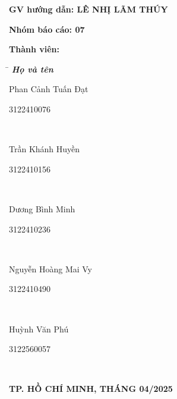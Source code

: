 \documentclass[a4paper,12pt]{report}
\begin{document}
\begin{titlepage}
    \vspace{15pt}
    \textbf{GV hướng dẫn: LÊ NHỊ LÃM THÚY}

    \vspace{10pt}
    \textbf{Nhóm báo cáo: 07}

    \vspace{10pt}
    \textbf{Thành viên:}
    \begin{center}
        
        \begin{tabbing}
            \hspace{8cm}\=\hspace{3cm} \kill
            {\it \textbf{Họ và tên}}\\
            \begin{bfseries}Phan Cảnh Tuấn Đạt\end{bfseries}\> \begin{bfseries}3122410076\end{bfseries}\\
            \begin{bfseries}Trần Khánh Huyền\end{bfseries}\> \begin{bfseries}3122410156\end{bfseries}\\
            \begin{bfseries}Dương Bình Minh\end{bfseries}\> \begin{bfseries}3122410236\end{bfseries}\\
            \begin{bfseries}Nguyễn Hoàng Mai Vy\end{bfseries}\> \begin{bfseries}3122410490\end{bfseries}\\
            \begin{bfseries}Huỳnh Văn Phú\end{bfseries}\> \begin{bfseries}3122560057\end{bfseries}\\
    
        \end{tabbing}
    \end{center}
    \vspace{10pt}
    \begin{center}
        \textbf{TP. HỒ CHÍ MINH, THÁNG 04/2025}
    \end{center}
\end{titlepage}
\end{document}
